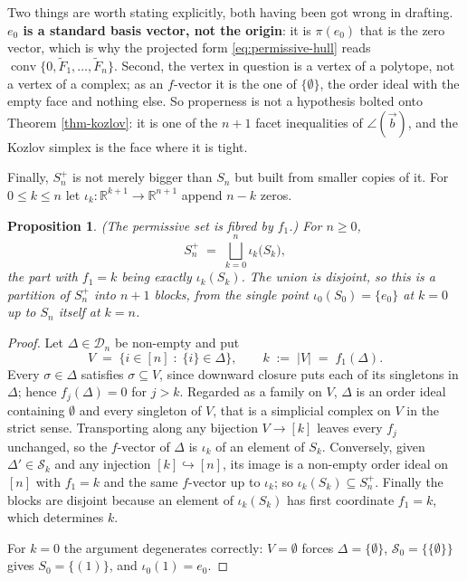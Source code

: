 \documentclass[11pt, a4paper, abstract=yes]{scrartcl}
\theoremstyle{definition}
\theoremstyle{remark}
\theoremstyle{plain}
\newtheorem{proposition}[definition]{Proposition}
\newcommand{\rasimp}{\angle}
\newcommand{\proj}{\pi}
\newcommand{\conv}{\operatorname{conv}}
\begin{document}
Two things are worth stating explicitly, both having been got wrong in drafting. \textbf{\textbf{\(e_0\) is a
standard basis vector, not the origin}}: it is \(\proj(e_0)\) that is the zero vector, which is why the
projected form \eqref{eq:permissive-hull} reads \(\conv\lbrace0,\tilde F_1,\dots,\tilde F_n\rbrace\).
Second, the vertex in question is a vertex of a polytope, not a vertex of a complex; as an \(f\)-vector it
is the one of \(\lbrace\emptyset\rbrace\), the order ideal with the empty face and nothing else. So
properness is not a hypothesis bolted onto Theorem \ref{thm-kozlov}: it is one of the \(n+1\) facet
inequalities of \(\rasimp(\vec b)\), and the Kozlov simplex is the face where it is tight.

Finally, \(S_n^{+}\) is not merely bigger than \(S_n\) but built from smaller copies of it. For
\(0\le k\le n\) let \(\iota_k:\mathbb R^{k+1}\to\mathbb R^{n+1}\) append \(n-k\) zeros.

\begin{proposition}
(\emph{The permissive set is fibred by \(f_1\).}) For \(n\ge0\),
\begin{equation}\label{eq:permissive-fibres}
  S_n^{+}\;=\;\bigsqcup_{k=0}^{n}\iota_k\bigl(S_k\bigr),
\end{equation}
the part with \(f_1=k\) being exactly \(\iota_k(S_k)\). The union is disjoint, so this is a partition
of \(S_n^{+}\) into \(n+1\) blocks, from the single point \(\iota_0(S_0)=\lbrace e_0\rbrace\) at
\(k=0\) up to \(S_n\) itself at \(k=n\).
\label{prop:permissive-fibres}
\label{prop-permissive-fibres}
\end{proposition}

\begin{proof}
Let \(\Delta\in\mathcal D_n\) be non-empty and put
\begin{equation}\label{eq:fibres-support}
  V\;=\;\bigl\lbrace i\in[n]\;:\;\lbrace i\rbrace\in\Delta\bigr\rbrace,
  \qquad
  k\;:=\;\lvert V\rvert\;=\;f_1(\Delta).
\end{equation}
Every \(\sigma\in\Delta\) satisfies \(\sigma\subseteq V\), since downward
closure puts each of its singletons in \(\Delta\); hence \(f_j(\Delta)=0\) for \(j>k\). Regarded as a
family on \(V\), \(\Delta\) is an order ideal containing \(\emptyset\) and every singleton of \(V\),
that is a simplicial complex on \(V\) in the strict sense. Transporting along any bijection
\(V\to[k]\) leaves every \(f_j\) unchanged, so the \(f\)-vector of \(\Delta\) is \(\iota_k\) of an
element of \(S_k\). Conversely, given \(\Delta'\in\mathcal S_k\) and any injection \([k]\hookrightarrow[n]\),
its image is a non-empty order ideal on \([n]\) with \(f_1=k\) and the same \(f\)-vector up to
\(\iota_k\); so \(\iota_k(S_k)\subseteq S_n^{+}\). Finally the blocks are disjoint because an element of
\(\iota_k(S_k)\) has first coordinate \(f_1=k\), which determines \(k\).

For \(k=0\) the argument degenerates correctly: \(V=\emptyset\) forces \(\Delta=\lbrace\emptyset\rbrace\),
\(\mathcal S_0=\lbrace\lbrace\emptyset\rbrace\rbrace\) gives \(S_0=\lbrace(1)\rbrace\), and
\(\iota_0(1)=e_0\).
\end{proof}
\end{document}
